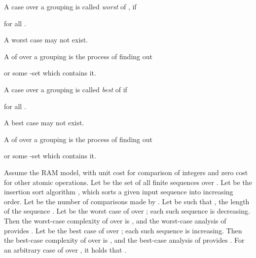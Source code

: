 \documentclass[b5paper, english, oneside]{memoir}
\begin{document}
\begin{definition}
A case  over a grouping  is called \emph{worst} of , if

for all .
\end{definition}

\begin{note}
A worst case may not exist.
\end{note}

\begin{definition}
A  of  over a grouping  is the process of finding out
\begin{eqs}
\sup {}
\end{eqs}
or some -set which contains it. 
\end{definition}

\begin{definition}
A case  over a grouping  is called \emph{best} of  if

for all . 
\end{definition}

\begin{note}
A best case may not exist.
\end{note}

\begin{definition}
A  of  over a grouping  is the process of finding out
\begin{eqs}
\inf {}
\end{eqs}
or some -set which contains it.
\end{definition}

\begin{example}
Assume the RAM model, with unit cost for comparison of integers and zero cost for other atomic operations. Let  be the set of all finite sequences over . Let  be the insertion sort algorithm \cite{IntroAlgo2009}, which sorts a given input sequence  into increasing order. Let  be the number of comparisons made by . Let  be such that , the length of the sequence . Let  be the worst case of  over ; each such sequence is decreasing. Then the worst-case complexity of  over  is , and the worst-case analysis of  provides . Let  be the best case of  over ; each such sequence is increasing. Then the best-case complexity of  over  is , and the best-case analysis of  provides . For an arbitrary case  of  over , it holds that .
\end{example}
\end{document}
